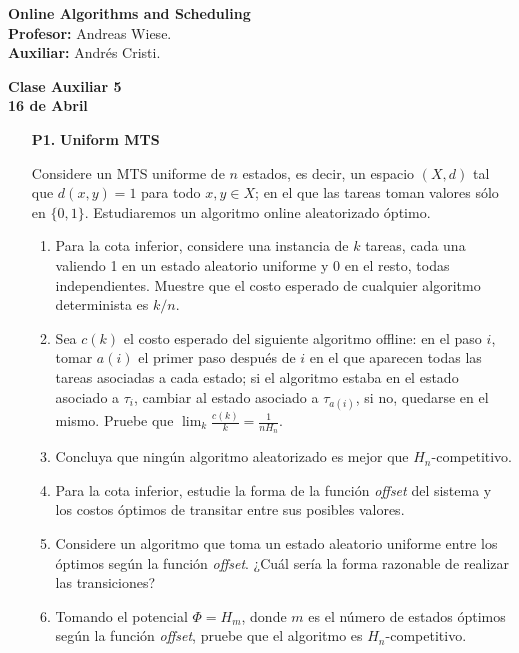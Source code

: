 \documentclass[11pt, spanish]{article}
\theoremstyle{plain}
\begin{document}

\begin{flushleft}
  \textbf{Online Algorithms and Scheduling}
  \\\textbf{Profesor:} Andreas Wiese.
  \\\textbf{Auxiliar:} Andrés Cristi.
\end{flushleft}


\begin{center}
  \large{\textbf{Clase Auxiliar 5\\ 16 de Abril }}
\end{center}




\begin{itemize}
  \item[\textbf{P1.}] \textbf{Uniform MTS}

    Considere un MTS uniforme de $n$ estados, es decir, un espacio $(X,d)$
    tal que $d(x,y)=1$ para todo $x,y\in X$; en el que las tareas
    toman valores sólo en $\{0,1\}$. Estudiaremos un algoritmo online
    aleatorizado óptimo.
    \begin{enumerate}
      \item Para la cota inferior, considere una instancia de $k$
	tareas, cada una valiendo 1 en un estado aleatorio uniforme y 0
	en el resto, todas independientes. Muestre que el costo
	esperado de cualquier algoritmo determinista es $k/n$.
      \item Sea $c(k)$ el costo esperado del siguiente algoritmo
      offline: en el paso $i$, tomar $a(i)$ el primer paso despu\'es de
      $i$ en el que aparecen todas las tareas asociadas a cada estado;
      si el algoritmo estaba en el estado asociado a $\tau_i$,
      cambiar al estado asociado a $\tau_{a(i)}$, si no, quedarse en
      el mismo. Pruebe que $\lim_k \frac{c(k)}{k}= \frac{1}{n H_n}$.
    \item Concluya que ningún algoritmo aleatorizado es mejor que 
      $H_n$-competitivo.
    \item Para la cota inferior, estudie la forma de la función 
      \textit{offset} del sistema y los costos óptimos de
      transitar entre sus posibles valores.
    \item Considere un algoritmo que toma un estado aleatorio uniforme
      entre los óptimos según la función \textit{offset}. ¿Cuál
      sería la forma razonable de realizar las transiciones?
    \item Tomando el potencial $\Phi=H_m$, donde $m$ es el número de 
      estados óptimos según la función \textit{offset}, pruebe
      que el algoritmo es $H_n$-competitivo.
  \end{enumerate}
\end{itemize}
\end{document}
